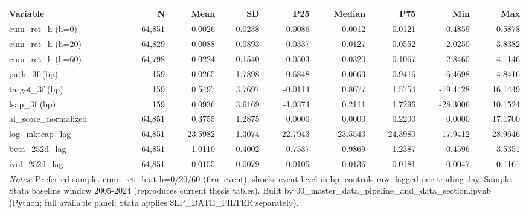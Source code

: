 \begin{tabular}{lrrrrrrrr}
\toprule
Variable & N & Mean & SD & P25 & Median & P75 & Min & Max \\
\midrule
cum\_ret\_h (h=0) & 64,851 & 0.0026 & 0.0238 & -0.0086 & 0.0012 & 0.0121 & -0.4859 & 0.5878 \\
cum\_ret\_h (h=20) & 64,829 & 0.0088 & 0.0893 & -0.0337 & 0.0127 & 0.0552 & -2.0250 & 3.8382 \\
cum\_ret\_h (h=60) & 64,798 & 0.0224 & 0.1540 & -0.0503 & 0.0320 & 0.1067 & -2.8460 & 4.1146 \\
path\_3f (bp) & 159 & -0.0265 & 1.7898 & -0.6848 & 0.0663 & 0.9416 & -6.4698 & 4.8416 \\
target\_3f (bp) & 159 & 0.5497 & 3.7697 & -0.0114 & 0.8677 & 1.5754 & -19.4428 & 16.1449 \\
lsap\_3f (bp) & 159 & 0.0936 & 3.6169 & -1.0374 & 0.2111 & 1.7296 & -28.3006 & 10.1524 \\
ai\_score\_normalized & 64,851 & 0.3755 & 1.2875 & 0.0000 & 0.0000 & 0.2200 & 0.0000 & 17.1700 \\
log\_mktcap\_lag & 64,851 & 23.5982 & 1.3074 & 22.7943 & 23.5543 & 24.3980 & 17.9412 & 28.9646 \\
beta\_252d\_lag & 64,851 & 1.0110 & 0.4002 & 0.7537 & 0.9869 & 1.2387 & -0.4596 & 3.5351 \\
ivol\_252d\_lag & 64,851 & 0.0155 & 0.0079 & 0.0105 & 0.0136 & 0.0181 & 0.0047 & 0.1161 \\
\bottomrule
\multicolumn{9}{p{0.95\linewidth}}{\footnotesize \textit{Notes:} Preferred sample. cum\_ret\_h at h=0/20/60 (firm-event); shocks event-level in bp; controls raw, lagged one trading day. Sample: Stata baseline window 2005-2024 (reproduces current thesis tables). Built by 00\_master\_data\_pipeline\_and\_data\_section.ipynb (Python; full available panel; Stata applies \$LP\_DATE\_FILTER separately).} \\
\end{tabular}
